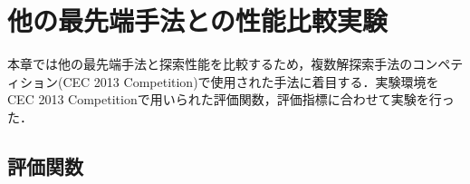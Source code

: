\documentclass[a4j,11pt]{jarticle}
\begin{document}
\FloatBarrier
\newpage
\section{他の最先端手法との性能比較実験}
\label{sec:experiment}
本章では他の最先端手法と探索性能を比較するため，複数解探索手法のコンペティション(CEC 2013 Competition)で使用された手法に着目する．実験環境をCEC 2013 Competitionで用いられた評価関数，評価指標に合わせて実験を行った．


\subsection{評価関数}
\end{document}
